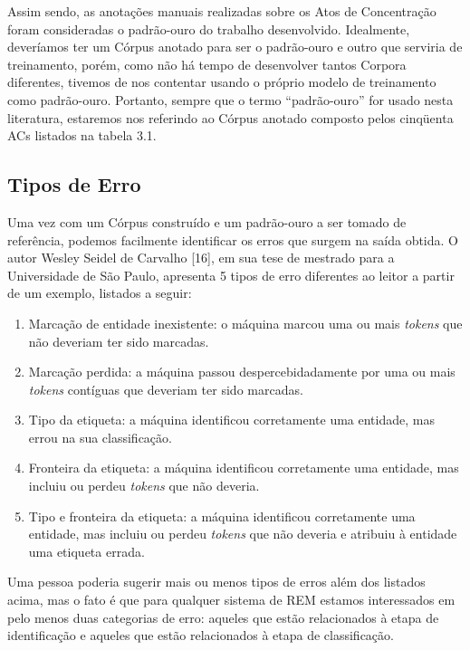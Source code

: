 \documentclass[11pt]{report}
\newcommand{\quotes}[1]{``#1''}
\begin{document}
Assim sendo, as anotações manuais realizadas sobre os Atos de Concentração foram consideradas o padrão-ouro do trabalho desenvolvido. Idealmente,
deveríamos ter um Córpus anotado para ser o padrão-ouro e outro que serviria de treinamento, porém, como não há tempo de desenvolver tantos Corpora diferentes, tivemos de nos
contentar usando o próprio modelo de treinamento como padrão-ouro. Portanto, sempre que o termo \quotes{padrão-ouro} for usado nesta literatura, estaremos nos referindo ao Córpus
anotado composto pelos cinqüenta ACs listados na tabela 3.1.

\subsection{Tipos de Erro}

\indent\indent Uma vez com um Córpus construído e um padrão-ouro a ser tomado de referência, podemos facilmente identificar os erros que surgem na saída obtida. O autor
Wesley Seidel de Carvalho [16], em sua tese de mestrado para a Universidade de São Paulo, apresenta 5 tipos de erro diferentes ao leitor a partir de um exemplo, listados a seguir:

\begin{enumerate}[label=\textbf{E\arabic*.}]
  \item Marcação de entidade inexistente: o máquina marcou uma ou mais \textit{tokens} que não deveriam ter sido marcadas.
  \item Marcação perdida: a máquina passou despercebidadamente por uma ou mais \textit{tokens} contíguas que deveriam ter sido marcadas.
  \item Tipo da etiqueta: a máquina identificou corretamente uma entidade, mas errou na sua classificação.
  \item Fronteira da etiqueta: a máquina identificou corretamente uma entidade, mas incluiu ou perdeu \textit{tokens} que não deveria.
  \item Tipo e fronteira da etiqueta: a máquina identificou corretamente uma entidade, mas incluiu ou perdeu \textit{tokens} que não deveria e atribuiu à entidade uma etiqueta errada.
\end{enumerate}

Uma pessoa poderia sugerir mais ou menos tipos de erros além
dos listados acima, mas o fato é que para qualquer sistema de REM estamos interessados em pelo menos duas categorias de erro: aqueles que estão relacionados à etapa de identificação
e aqueles que estão relacionados à etapa de classificação.
\end{document}
